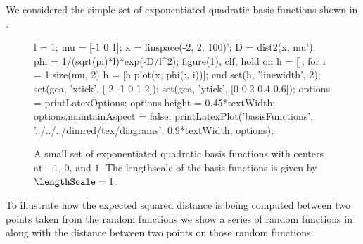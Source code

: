 We considered the simple set of exponentiated quadratic basis
functions shown in .
\begin{figure}
  \begin{matlab}
    l = 1;
    mu = [-1 0 1];
    x = linspace(-2, 2, 100)';
    D = dist2(x, mu');
    phi = 1/(sqrt(pi)*l)*exp(-D/l^2);
    figure(1), clf, hold on
    h = [];
    for i = 1:size(mu, 2)
      h = [h plot(x, phi(:, i))];
    end
    set(h, 'linewidth', 2);
    set(gca, 'xtick', [-2 -1 0 1 2]);
    set(gca, 'ytick', [0 0.2 0.4 0.6]);
    options = printLatexOptions;
    options.height = 0.45*textWidth; options.maintainAspect = false;
    printLatexPlot('basisFunctions', '../../../dimred/tex/diagrams', 0.9*textWidth, options);
  \end{matlab}
  \begin{center}
    
  \end{center}
  \caption{A small set of exponentiated quadratic basis functions with
    centers at $-1$, $0$, and $1$. The lengthscale of the basis
    functions is given by $\lengthScale=1$.}\label{fig:basisFunctions}
\end{figure}
To illustrate how the expected squared distance is being computed
between two points taken from the random functions we show a series of
random functions in  along with the
distance between two points on those random functions.
